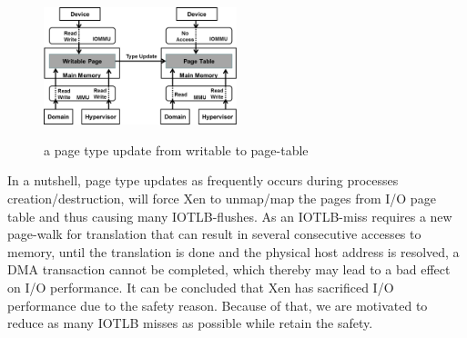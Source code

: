 \begin{figure}[ht]
\centering
\includegraphics[width=0.5\textwidth]{image/translation/wr2pt.png} \\
\caption{a page type update from writable to page-table}
\label{fig:wr2pt}
\end{figure}

In a nutshell, page type updates as frequently occurs during processes creation/destruction, will force Xen to unmap/map the pages from I/O page table and thus causing many IOTLB-flushes. As an IOTLB-miss requires a new page-walk for translation that can result in several consecutive accesses to memory, until the translation is done and the physical host address is resolved, a DMA transaction cannot be completed, which thereby may lead to a bad effect on I/O performance. It can be concluded that Xen has sacrificed I/O performance due to the safety reason. Because of that, we are motivated to reduce as many IOTLB misses as possible while retain the safety.

